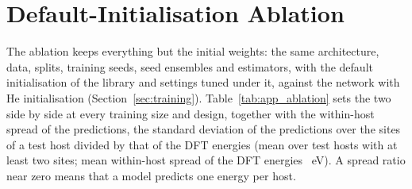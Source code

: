 \section{Default-Initialisation Ablation}
\label{app:ablation}

The ablation keeps everything but the initial weights: the same architecture, data, splits, training seeds, seed ensembles and estimators, with the default initialisation of the library and settings tuned under it, against the network with He initialisation (Section~\ref{sec:training}). Table~\ref{tab:app_ablation} sets the two side by side at every training size and design, together with the within-host spread of the predictions, the standard deviation of the predictions over the sites of a test host divided by that of the DFT energies (mean over test hosts with at least two sites; mean within-host spread of the DFT energies \numNetSpreadTargetSd{}~eV). A spread ratio near zero means that a model predicts one energy per host.

